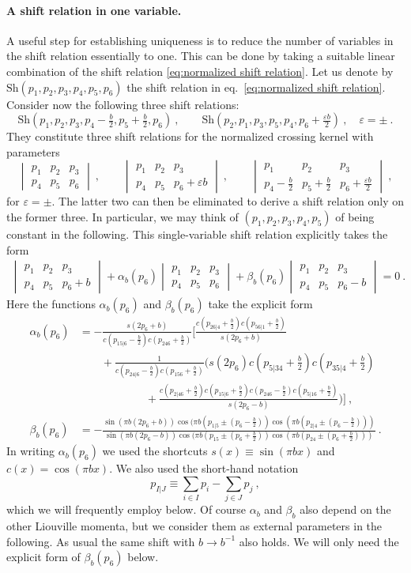 \documentclass[12pt,a4paper]{article}
\newcommand{\be}{\begin{equation}}
\newcommand{\ee}{\end{equation}}
\newcommand{\sixjnorm}[6]{\begin{vmatrix}
#1 & #2 & #3 \\
#4 & #5 & #6
\end{vmatrix}
}
\begin{document}
\paragraph{A shift relation in one variable.} A useful step for establishing uniqueness is to reduce the number of variables in the shift relation essentially to one. This can be done by taking a suitable linear combination of the shift relation \eqref{eq:normalized shift relation}. Let us denote by $\text{Sh}(p_1,p_2,p_3,p_4,p_5,p_6)$ the shift relation in eq.~\eqref{eq:normalized shift relation}. Consider now the following three shift relations:
\be 
\text{Sh}(p_1,p_2,p_3,p_4-\tfrac{b}{2},p_5+\tfrac{b}{2},p_6)\ , \qquad \text{Sh}(p_2,p_1,p_3,p_5,p_4,p_6+\tfrac{ \varepsilon b}{2})\ , \quad \varepsilon=\pm\ .
\ee
They constitute three shift relations for the normalized crossing kernel with parameters
\be 
\sixjnorm{p_1}{p_2}{p_3}{p_4}{p_5}{p_6}\ , \qquad \sixjnorm{p_1}{p_2}{p_3}{p_4}{p_5}{p_6+ \varepsilon b}\ , \qquad \sixjnorm{p_1}{p_2}{p_3}{p_4-\frac{b}{2}}{p_5+\frac{b}{2}}{p_6+\frac{\varepsilon b}{2}}\ ,
\ee
for $\varepsilon=\pm$.
The latter two can then be eliminated to derive a shift relation only on the former three. In particular, we may think of $(p_1,p_2,p_3,p_4,p_5)$ of being constant in the following.
This single-variable shift relation explicitly takes the form
\begin{align}
    \sixjnorm{p_1}{p_2}{p_3}{p_4}{p_5}{p_6+b}+\alpha_b(p_6)\sixjnorm{p_1}{p_2}{p_3}{p_4}{p_5}{p_6}+\beta_b(p_6) \sixjnorm{p_1}{p_2}{p_3}{p_4}{p_5}{p_6-b}=0\ . \label{eq:single variable shift relation}
\end{align}
Here the functions $\alpha_b(p_6)$ and $\beta_b(p_6)$ take the explicit form
\begin{subequations}
\begin{align}
    \alpha_b(p_6)&= -\frac{s(2 p_6+b) }{c (p_{15|6}-\frac{b}{2}) c  (p_{246}+\frac{b}{2}) }\bigg[\frac{c(p_{26|4}+\frac{b}{2}) c(p_{56|1}+\frac{b}{2})}{s(2p_6+b)} \nonumber\\
    &\qquad+\frac{1}{c(p_{24|6}-\frac{b}{2})c(p_{156}+\frac{b}{2})} \bigg(s(2  p_6) c(p_{5|34} +\tfrac{b}{2}) c (p_{35|4}+\tfrac{b}{2})\nonumber\\
    &\qquad\qquad\qquad+\frac{c (p_{2|46}+\frac{b}{2}) c(p_{15|6}+\frac{b}{2}) c(p_{246}-\frac{b}{2}) c (p_{5|16}+\frac{b}{2})}{s(2 p_6-b)}\bigg)\bigg] \ ,\\
    \beta_b(p_6)&=-\frac{\sin(\pi b(2p_6+b))\cos(\pi b(p_{1|5} \pm (p_6-\frac{b}{2})) \cos(\pi b(p_{2|4} \pm (p_6-\frac{b}{2})))}{\sin(\pi b(2p_6-b))\cos(\pi b(p_{15} \pm (p_6+\frac{b}{2}))\cos(\pi b(p_{24} \pm (p_6+\frac{b}{2})))}\ .
\end{align} \label{eq:alpha and beta}%
\end{subequations}
In writing $\alpha_b(p_6)$ we used the shortcuts $s(x) \equiv \sin(\pi b x)$ and $c(x)=\cos(\pi b x)$. We also used the short-hand notation
\be 
p_{I|J} \equiv \sum_{i \in I} p_i-\sum_{j \in J} p_j\ , \label{eq:definition pI|J}
\ee
which we will frequently employ below.
Of course $\alpha_b$ and $\beta_b$ also depend on the other Liouville momenta, but we consider them as external parameters in the following. As usual the same shift with $b \to b^{-1}$ also holds. We will only need the explicit form of $\beta_b(p_6)$ below. 
\end{document}
